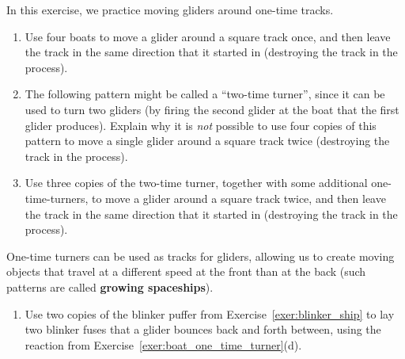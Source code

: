 \begin{multicols}{2}
	
	\mfilbreak
	
	
	\begin{problemstar}\label{exer:turner_tracks}
		In this exercise, we practice moving gliders around one-time tracks.\smallskip
		
		\begin{enumerate}[label=\bf\color{ocre}(\alph*)]
			\item {} Use four boats to move a glider around a square track once, and then leave the track in the same direction that it started in (destroying the track in the process).
			
			\item {} The following pattern might be called a ``two-time turner'', since it can be used to turn two gliders (by firing the second glider at the boat that the first glider produces). Explain why it is \emph{not} possible to use four copies of this pattern to move a single glider around a square track twice (destroying the track in the process).
			\begin{center}
			\end{center}
			
			\item {} Use three copies of the two-time turner, together with some additional one-time-turners, to move a glider around a square track twice, and then leave the track in the same direction that it started in (destroying the track in the process).
		\end{enumerate}
	\end{problemstar}
	
	
	\mfilbreak
	
	
	\begin{problemstar}\label{exer:one_time_track} 
		One-time turners can be used as tracks for gliders, allowing us to create moving objects that travel at a different speed at the front than at the back (such patterns are called \textbf{growing spaceships}).\smallskip
		
		\begin{enumerate}[label=\bf\color{ocre}(\alph*)]
			\item Use two copies of the blinker puffer from Exercise~\ref{exer:blinker_ship} to lay two blinker fuses that a glider bounces back and forth between, using the reaction from Exercise~\ref{exer:boat_one_time_turner}(d).
			

\end{enumerate}
\end{problemstar}
\end{multicols}
